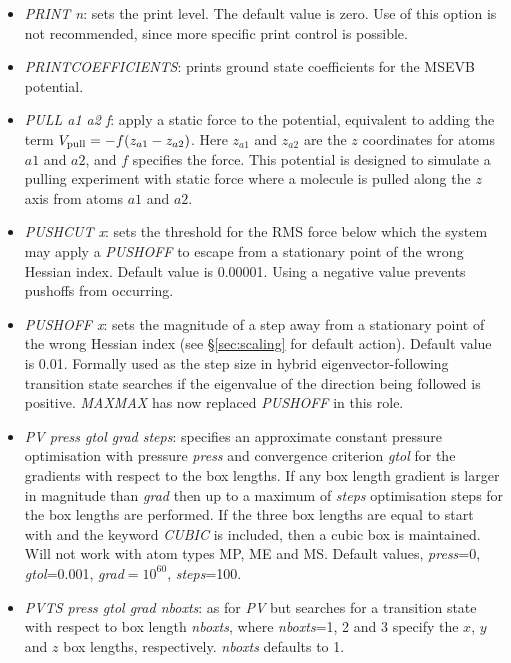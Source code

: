 \documentclass[12pt,a4paper,dvips]{article}
\begin{document}
\begin{itemize}
\item {\it PRINT n\/}: sets the print level. The default value is zero. Use
of this option is not recommended, since more specific print control is possible.

\item {\it PRINTCOEFFICIENTS\/}: prints ground state coefficients for the MSEVB potential.

\item {\it PULL a1 a2 f\/}: apply a static force to the potential, equivalent to adding
the term $V_{\rm pull}=-f(z_{a1}-z_{a2})$. Here $z_{a1}$ and $z_{a2}$ are the $z$
coordinates for atoms $a1$ and $a2$, and $f$ specifies the force.
This potential is designed to simulate a pulling experiment with static force where
a molecule is pulled along the $z$ axis from atoms $a1$ and $a2$.

\item {\it PUSHCUT x\/}: sets the threshold for the RMS force below which the
system may apply a {\it PUSHOFF\/} to escape from a stationary point of the wrong Hessian
index. Default value is 0.00001. Using a negative value prevents pushoffs from
occurring.

\item {\it PUSHOFF x\/}: sets the magnitude of a step away from a stationary
point of the wrong Hessian index (see \S\ref{sec:scaling} for default action). Default value is 0.01.
Formally used as the step size in hybrid eigenvector-following
transition state searches if the eigenvalue of the direction being followed is positive.
{\it MAXMAX} has now replaced {\it PUSHOFF\/} in this role.

\item {\it PV press gtol grad steps\/}: specifies an approximate constant pressure optimisation with
pressure {\it press\/} and convergence criterion {\it gtol\/} for the gradients with
respect to the box lengths. If any box length gradient is larger in magnitude than
{\it grad\/} then up to a maximum of {\it steps\/} optimisation steps for the box lengths
are performed.
If the three box lengths are equal to start with and the keyword {\it CUBIC \/} is included,
then a cubic box is maintained. 
Will not work with atom types MP, ME and MS.
Default values, {\it press\/}=0, {\it gtol\/}=0.001, {\it grad\/}$=10^{60}$, {\it steps\/}=100.

\item {\it PVTS press gtol grad nboxts\/}: as for {\it PV\/} but searches for a transition
state with respect to box length {\it nboxts\/}, where {\it nboxts\/}=1, 2 and 3 specify the
$x$, $y$ and $z$ box lengths, respectively. {\it nboxts\/} defaults to 1.


\end{itemize}
\end{document}
